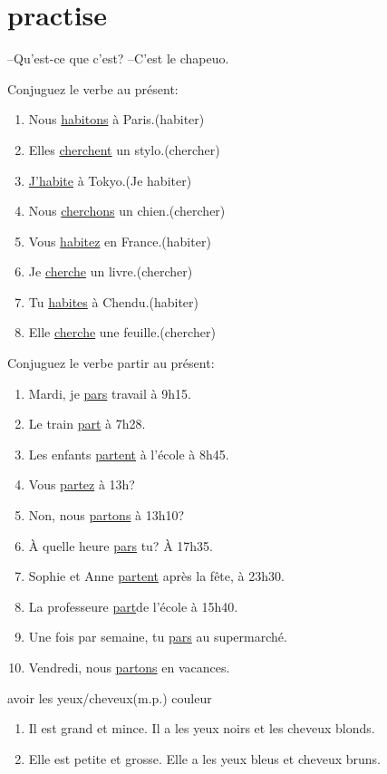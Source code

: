 \documentclass[./templates/main.tex]{subfiles}
\begin{document}
\section{practise}
--Qu'est-ce que c'est?
--C'est le chapeuo.
\begin{practice}
  Conjuguez le verbe au présent:
  \begin{enumerate}[label=(\arabic*)]
    \item Nous \underline{habitons} à Paris.(habiter)
    \item Elles \underline{cherchent} un stylo.(chercher)
    \item \underline{J'habite} à Tokyo.(Je habiter)
    \item Nous \underline{cherchons} un chien.(chercher)
    \item Vous \underline{habitez} en France.(habiter)
    \item Je \underline{cherche} un livre.(chercher)
    \item Tu \underline{habites} à Chendu.(habiter)
    \item Elle \underline{cherche} une feuille.(chercher)
  \end{enumerate}
\end{practice}
\begin{practice}
  Conjuguez le verbe partir au présent:
  \begin{enumerate}[label=(\arabic*)]
    \item Mardi, je \underline{pars} travail à 9h15.
    \item Le train \underline{part} à 7h28.
    \item Les enfants \underline{partent} à l’école à 8h45.
    \item Vous \underline{partez} à 13h?
    \item Non, nous \underline{partons} à 13h10?
    \item À quelle heure \underline{pars} tu? À 17h35.
    \item Sophie et Anne \underline{partent} après la fête, à 23h30.
    \item La professeure \underline{part}de l’école à 15h40.
    \item Une fois par semaine, tu \underline{pars} au supermarché.
    \item Vendredi, nous \underline{partons} en vacances.
  \end{enumerate}
\end{practice}
\begin{practice} avoir les yeux/cheveux(m.p.) couleur
  \begin{enumerate}[label=(\arabic*)]
    \item Il est grand et mince. Il a les yeux noirs et les cheveux blonds.
    \item Elle est petite et grosse. Elle a les yeux bleus et cheveux bruns.
  \end{enumerate}
\end{practice}
\end{document}
